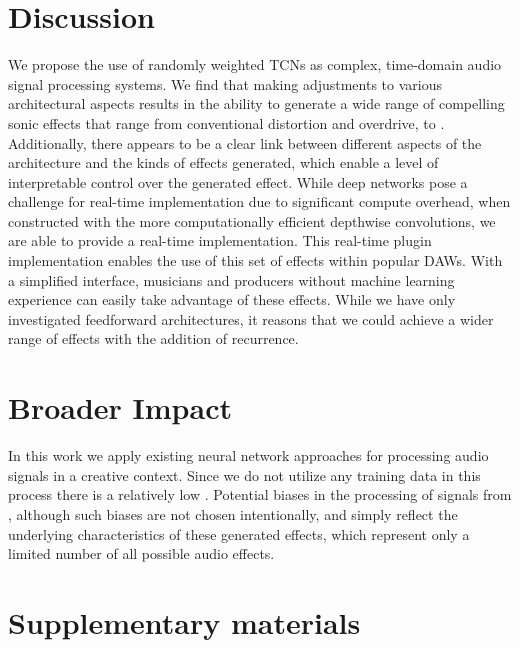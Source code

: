 \documentclass{article}
\begin{document}
\section{Discussion}

We propose the use of randomly weighted TCNs as complex, time-domain audio signal processing systems. 
We find that making adjustments to various architectural aspects results in the ability to generate a wide range of compelling sonic effects
that range from conventional distortion and overdrive, to .
Additionally, there appears to be a clear link between different aspects of the architecture and the kinds of effects generated, 
which enable a level of interpretable control over the generated effect. 
While deep networks pose a challenge for real-time implementation due to significant compute overhead, 
when constructed with the more computationally efficient depthwise convolutions,
we are able to provide a real-time implementation. 
This real-time plugin implementation enables the use of this set of effects within popular DAWs. 
With a simplified interface, musicians and producers without machine learning experience can easily take advantage of these effects.
While we have only investigated feedforward architectures, 
it reasons that we could achieve a wider range of effects with the addition of recurrence.

\section*{Broader Impact}
In this work we apply existing neural network approaches for processing audio signals in a creative context.
Since we do not utilize any training data in this process there is a relatively low . 
Potential biases in the processing of signals from , although such biases are not chosen intentionally, 
and simply reflect the underlying characteristics of these generated effects, 
which represent only a limited number of all possible audio effects. 

{}


\newpage
\section*{Supplementary materials}
\end{document}
